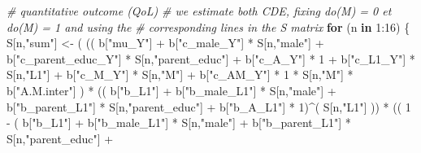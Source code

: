 \documentclass[
]{book}
\newenvironment{Shaded}{\begin{snugshade}}{\end{snugshade}}
\newcommand{\CommentTok}[1]{\textcolor[rgb]{0.56,0.35,0.01}{\textit{#1}}}
\newcommand{\ControlFlowTok}[1]{\textcolor[rgb]{0.13,0.29,0.53}{\textbf{#1}}}
\newcommand{\DecValTok}[1]{\textcolor[rgb]{0.00,0.00,0.81}{#1}}
\newcommand{\NormalTok}[1]{#1}
\newcommand{\OtherTok}[1]{\textcolor[rgb]{0.56,0.35,0.01}{#1}}
\newcommand{\SpecialCharTok}[1]{\textcolor[rgb]{0.00,0.00,0.00}{#1}}
\newcommand{\StringTok}[1]{\textcolor[rgb]{0.31,0.60,0.02}{#1}}
\begin{document}
\begin{Shaded}
\begin{Highlighting}[]
  \CommentTok{\# quantitative outcome (QoL)}
  \CommentTok{\# we estimate both CDE, fixing do(M) = 0 et do(M) = 1 and using the }
  \CommentTok{\# corresponding lines in the S matrix}
  \ControlFlowTok{for}\NormalTok{ (n }\ControlFlowTok{in} \DecValTok{1}\SpecialCharTok{:}\DecValTok{16}\NormalTok{) \{}
\NormalTok{    S[n,}\StringTok{"sum"}\NormalTok{] }\OtherTok{\textless{}{-}}\NormalTok{ ( (( b[}\StringTok{"mu\_Y"}\NormalTok{] }\SpecialCharTok{+} 
\NormalTok{                        b[}\StringTok{"c\_male\_Y"}\NormalTok{] }\SpecialCharTok{*}\NormalTok{ S[n,}\StringTok{"male"}\NormalTok{] }\SpecialCharTok{+} 
\NormalTok{                        b[}\StringTok{"c\_parent\_educ\_Y"}\NormalTok{] }\SpecialCharTok{*}\NormalTok{ S[n,}\StringTok{"parent\_educ"}\NormalTok{] }\SpecialCharTok{+} 
\NormalTok{                        b[}\StringTok{"c\_A\_Y"}\NormalTok{] }\SpecialCharTok{*} \DecValTok{1} \SpecialCharTok{+} 
\NormalTok{                        b[}\StringTok{"c\_L1\_Y"}\NormalTok{] }\SpecialCharTok{*}\NormalTok{ S[n,}\StringTok{"L1"}\NormalTok{] }\SpecialCharTok{+}
\NormalTok{                        b[}\StringTok{"c\_M\_Y"}\NormalTok{] }\SpecialCharTok{*}\NormalTok{ S[n,}\StringTok{"M"}\NormalTok{] }\SpecialCharTok{+}
\NormalTok{                        b[}\StringTok{"c\_AM\_Y"}\NormalTok{] }\SpecialCharTok{*} \DecValTok{1} \SpecialCharTok{*}\NormalTok{ S[n,}\StringTok{"M"}\NormalTok{] }\SpecialCharTok{*}\NormalTok{ b[}\StringTok{"A.M.inter"}\NormalTok{] ) }\SpecialCharTok{*}
\NormalTok{                      (( b[}\StringTok{"b\_L1"}\NormalTok{] }\SpecialCharTok{+}
\NormalTok{                           b[}\StringTok{"b\_male\_L1"}\NormalTok{] }\SpecialCharTok{*}\NormalTok{ S[n,}\StringTok{"male"}\NormalTok{] }\SpecialCharTok{+}  
\NormalTok{                           b[}\StringTok{"b\_parent\_L1"}\NormalTok{] }\SpecialCharTok{*}\NormalTok{ S[n,}\StringTok{"parent\_educ"}\NormalTok{] }\SpecialCharTok{+}
\NormalTok{                           b[}\StringTok{"b\_A\_L1"}\NormalTok{] }\SpecialCharTok{*} \DecValTok{1}\NormalTok{)}\SpecialCharTok{\^{}}\NormalTok{( S[n,}\StringTok{"L1"}\NormalTok{] )) }\SpecialCharTok{*}
\NormalTok{                      (( }\DecValTok{1} \SpecialCharTok{{-}}\NormalTok{ ( b[}\StringTok{"b\_L1"}\NormalTok{] }\SpecialCharTok{+}
\NormalTok{                                 b[}\StringTok{"b\_male\_L1"}\NormalTok{] }\SpecialCharTok{*}\NormalTok{ S[n,}\StringTok{"male"}\NormalTok{] }\SpecialCharTok{+}  
\NormalTok{                                 b[}\StringTok{"b\_parent\_L1"}\NormalTok{] }\SpecialCharTok{*}\NormalTok{ S[n,}\StringTok{"parent\_educ"}\NormalTok{] }\SpecialCharTok{+}

\end{Highlighting}
\end{Shaded}
\end{document}
